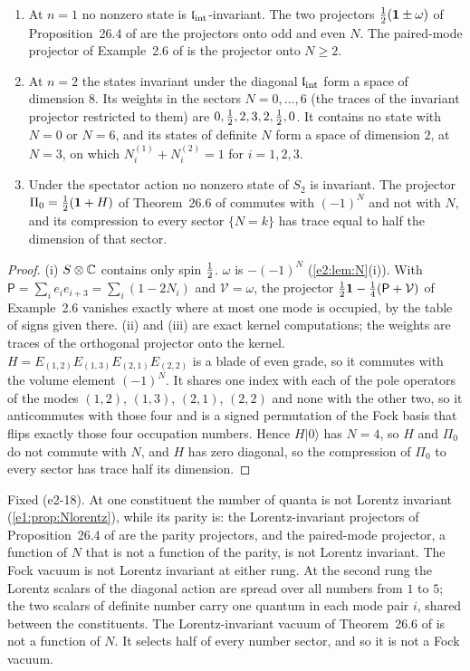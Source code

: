 \begin{proposition}
\label{e2:prop:invstates}
\begin{enumerate}[label=(\roman*),leftmargin=2.2em]
\item At $n=1$ no nonzero state is $\mathfrak l_{\rm int}$-invariant. The two projectors $\tfrac12(\mathbf 1\pm\omega)$ of Proposition~26.4 of \cite{ES17} are the projectors
onto odd and even $N$. The paired-mode projector of Example~2.6 of \cite{ES17} is the projector onto $N\ge2$.
\item At $n=2$ the states invariant under the diagonal $\mathfrak l_{\rm int}$ form a space of dimension $8$. Its weights in the sectors $N=0,\dots,6$ (the
traces of the invariant projector restricted to them) are $0,\tfrac12,2,3,2,\tfrac12,0$. It contains no state with $N=0$ or $N=6$, and its states of
definite $N$ form a space of dimension $2$, at $N=3$, on which $N^{(1)}_i+N^{(2)}_i=1$ for $i=1,2,3$.
\item Under the spectator action no nonzero state of $S_2$ is invariant. The projector $\Pi_0=\tfrac12(\mathbf 1+H)$ of Theorem~26.6 of \cite{ES17}
commutes with $(-1)^N$ and not with $N$, and its compression to every sector $\{N=k\}$ has trace equal to half the dimension of that sector.
\end{enumerate}
\end{proposition}

\begin{proof}
(i) $S\otimes\mathbb{C}$ contains only spin $\tfrac12$. $\omega$ is $-(-1)^N$ (\cref{e2:lem:N}(i)). With $\mathsf P=\sum_ie_ie_{i+3}=\sum_i(1-2N_i)$ and
$\mathcal V=\omega$, the projector $\tfrac12\mathbf 1-\tfrac14(\mathsf P+\mathcal V)$ of Example~2.6 vanishes exactly where at most one mode is occupied, by the
table of signs given there. (ii) and (iii) are exact kernel computations; the weights are traces of the orthogonal projector onto the
kernel. $H=E_{(1,2)}E_{(1,3)}E_{(2,1)}E_{(2,2)}$ is a blade of even grade, so it commutes with the volume element $(-1)^N$. It shares one
index with each of the pole operators of the modes $(1,2)$, $(1,3)$, $(2,1)$, $(2,2)$ and none with the other two, so it anticommutes with
those four and is a signed permutation of the Fock basis that flips exactly those four occupation numbers. Hence $H|0\rangle$ has $N=4$, so
$H$ and $\Pi_0$ do not commute with $N$, and $H$ has zero diagonal, so the compression of $\Pi_0$ to every sector has trace half its
dimension.
\end{proof}

Fixed (e2-18). At one constituent the number of quanta is not Lorentz invariant (\cref{e1:prop:Nlorentz}), while its parity is: the
Lorentz-invariant projectors of Proposition~26.4 of \cite{ES17} are the parity projectors, and the paired-mode projector, a function of $N$
that is not a function of the parity, is not Lorentz invariant. The Fock vacuum is not Lorentz invariant at either rung. At the second rung the Lorentz scalars of the diagonal action are spread
over all numbers from $1$ to $5$; the two scalars of definite number carry one quantum in each mode pair $i$, shared between the
constituents. The Lorentz-invariant vacuum of Theorem~26.6 of \cite{ES17} is not a function of $N$. It selects half of every number sector,
and so it is not a Fock vacuum.


